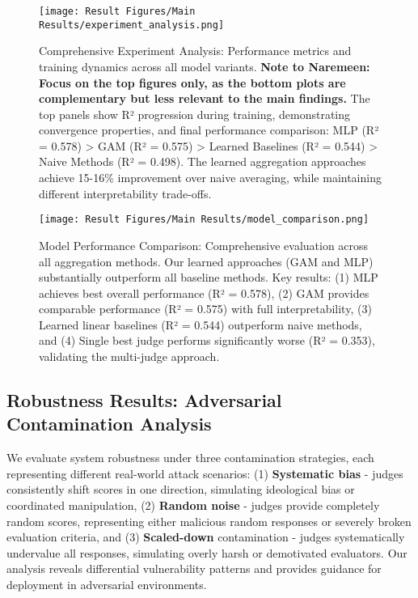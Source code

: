 \begin{figure}[H]
    \centering
    \texttt{[image: Result Figures/Main Results/experiment\_analysis.png]}
    \caption{Comprehensive Experiment Analysis: Performance metrics and training dynamics across all model variants. \textbf{Note to Naremeen: Focus on the top figures only, as the bottom plots are complementary but less relevant to the main findings.} The top panels show R² progression during training, demonstrating convergence properties, and final performance comparison: MLP (R² = 0.578) > GAM (R² = 0.575) > Learned Baselines (R² = 0.544) > Naive Methods (R² = 0.498). The learned aggregation approaches achieve 15-16\% improvement over naive averaging, while maintaining different interpretability trade-offs.}
    \label{fig:experiment_analysis}
\end{figure}

\begin{figure}[H]
    \centering
    \texttt{[image: Result Figures/Main Results/model\_comparison.png]}
    \caption{Model Performance Comparison: Comprehensive evaluation across all aggregation methods. Our learned approaches (GAM and MLP) substantially outperform all baseline methods. Key results: (1) MLP achieves best overall performance (R² = 0.578), (2) GAM provides comparable performance (R² = 0.575) with full interpretability, (3) Learned linear baselines (R² = 0.544) outperform naive methods, and (4) Single best judge performs significantly worse (R² = 0.353), validating the multi-judge approach.}
    \label{fig:model_comparison}
\end{figure}

\subsection{Robustness Results: Adversarial Contamination Analysis}

We evaluate system robustness under three contamination strategies, each representing different real-world attack scenarios: (1) \textbf{Systematic bias} - judges consistently shift scores in one direction, simulating ideological bias or coordinated manipulation, (2) \textbf{Random noise} - judges provide completely random scores, representing either malicious random responses or severely broken evaluation criteria, and (3) \textbf{Scaled-down} contamination - judges systematically undervalue all responses, simulating overly harsh or demotivated evaluators. Our analysis reveals differential vulnerability patterns and provides guidance for deployment in adversarial environments.

